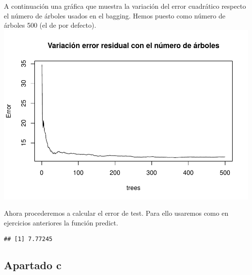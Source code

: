 \documentclass[]{article}
\newenvironment{Shaded}{\begin{snugshade}}{\end{snugshade}}
\newcommand{\KeywordTok}[1]{\textcolor[rgb]{0.13,0.29,0.53}{\textbf{{#1}}}}
\newcommand{\DataTypeTok}[1]{\textcolor[rgb]{0.13,0.29,0.53}{{#1}}}
\newcommand{\DecValTok}[1]{\textcolor[rgb]{0.00,0.00,0.81}{{#1}}}
\newcommand{\StringTok}[1]{\textcolor[rgb]{0.31,0.60,0.02}{{#1}}}
\newcommand{\NormalTok}[1]{{#1}}
\begin{document}
A continuación una gráfica que muestra la variación del error cuadrático
respecto el número de árboles usados en el bagging. Hemos puesto como
número de árboles 500 (el de por defecto).
\includegraphics{TrabajoPracticas3_files/figure-latex/unnamed-chunk-51-1.pdf}

Ahora procederemos a calcular el error de test. Para ello usaremos como
en ejercicios anteriores la función predict.

\begin{Shaded}
\end{Shaded}

\begin{verbatim}
## [1] 7.77245
\end{verbatim}

\subsection{Apartado c}\label{apartado-c-1}
\end{document}
